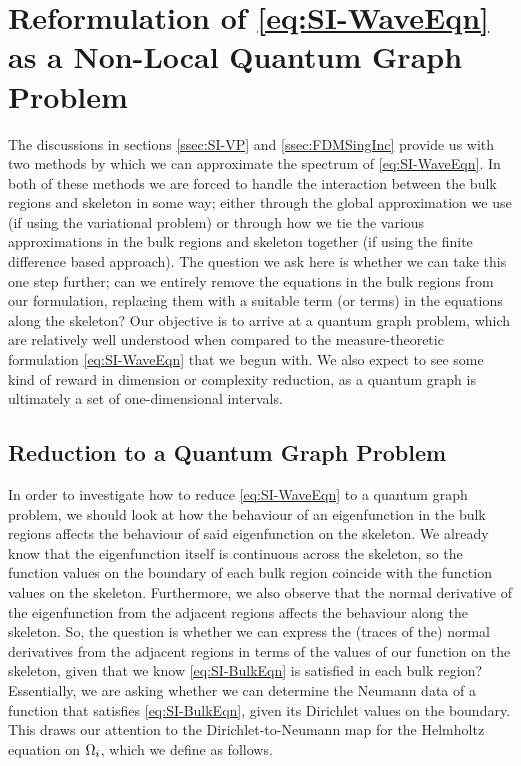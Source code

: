 \section{Reformulation of \eqref{eq:SI-WaveEqn} as a Non-Local Quantum Graph Problem} \label{sec:SI-NonLocalQG}


The discussions in sections \ref{ssec:SI-VP} and \ref{ssec:FDMSingInc} provide us with two methods by which we can approximate the spectrum of \eqref{eq:SI-WaveEqn}.
In both of these methods we are forced to handle the interaction between the bulk regions and skeleton in some way; either through the global approximation we use (if using the variational problem) or through how we tie the various approximations in the bulk regions and skeleton together (if using the finite difference based approach).
The question we ask here is whether we can take this one step further; can we entirely remove the equations in the bulk regions from our formulation, replacing them with a suitable term (or terms) in the equations along the skeleton?
Our objective is to arrive at a quantum graph problem, which are relatively well understood when compared to the measure-theoretic formulation \eqref{eq:SI-WaveEqn} that we begun with.
We also expect to see some kind of reward in dimension or complexity reduction, as a quantum graph is ultimately a set of one-dimensional intervals.

\subsection{Reduction to a Quantum Graph Problem} \label{ssec:SI-ToQG}
In order to investigate how to reduce \eqref{eq:SI-WaveEqn} to a quantum graph problem, we should look at how the behaviour of an eigenfunction in the bulk regions affects the behaviour of said eigenfunction on the skeleton.
We already know that the eigenfunction itself is continuous across the skeleton, so the function values on the boundary of each bulk region coincide with the function values on the skeleton.
Furthermore, we also observe that the normal derivative of the eigenfunction from the adjacent regions affects the behaviour along the skeleton.
So, the question is whether we can express the (traces of the) normal derivatives from the adjacent regions in terms of the values of our function on the skeleton, given that we know \eqref{eq:SI-BulkEqn} is satisfied in each bulk region?
Essentially, we are asking whether we can determine the Neumann data of a function that satisfies \eqref{eq:SI-BulkEqn}, given its Dirichlet values on the boundary.
This draws our attention to the Dirichlet-to-Neumann map for the Helmholtz equation on $\Omega_i$, which we define as follows.

